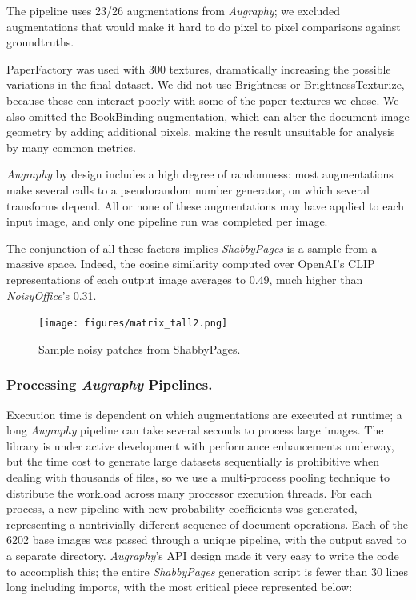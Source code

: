 \documentclass[runningheads]{llncs}
\begin{document}
The pipeline uses 23/26 augmentations from \emph{Augraphy}; we excluded augmentations that would make it hard to do pixel to pixel comparisons against groundtruths.

PaperFactory was used with 300 textures, dramatically increasing the possible variations in the final dataset. We did not use Brightness or BrightnessTexturize, because these can interact poorly with some of the paper textures we chose. We also omitted the BookBinding augmentation, which can alter the document image geometry by adding additional pixels, making the result unsuitable for analysis by many common metrics.

\emph{Augraphy} by design includes a high degree of randomness: most augmentations make several calls to a pseudorandom number generator, on which several transforms depend.
All or none of these augmentations may have applied to each input image, and only one pipeline run was completed per image.

The conjunction of all these factors implies \emph{ShabbyPages} is a sample from a massive space.
Indeed, the cosine similarity computed over OpenAI's CLIP representations of each output image averages to 0.49, much higher than \emph{NoisyOffice}'s 0.31.

\begin{figure}
    \texttt{[image: figures/matrix\_tall2.png]}
    \caption{Sample noisy patches from ShabbyPages.}
    \label{fig:matrix_tall2}
\end{figure}

\subsubsection{Processing \emph{Augraphy} Pipelines.}
Execution time is dependent on which augmentations are executed at runtime; a long \emph{Augraphy} pipeline can take several seconds to process large images.
The library is under active development with performance enhancements underway, but the time cost to generate large datasets sequentially is prohibitive when dealing with thousands of files, so we use a multi-process pooling technique to distribute the workload across many processor execution threads.
For each process, a new pipeline with new probability coefficients was generated, representing a nontrivially-different sequence of document operations.
Each of the 6202 base images was passed through a unique pipeline, with the output saved to a separate directory.
\emph{Augraphy}'s API design made it very easy to write the code to accomplish this; the entire \emph{ShabbyPages} generation script is fewer than 30 lines long including imports, with the most critical piece represented below:
\end{document}
